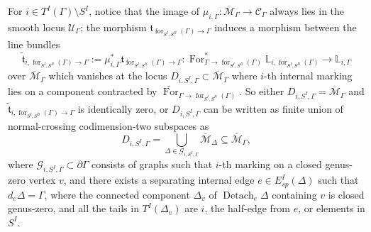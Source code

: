 \documentclass[11pt]{amsart}
\theoremstyle{definition}
\theoremstyle{remark}
\renewcommand{\for}{\operatorname{for}}
\newcommand{\For}{\operatorname{For}}
\newcommand{\<}{\left<}
\renewcommand{\>}{\right>}
\numberwithin{equation}{section}
\def\Mbar{{\overline{\mathcal M}}}
\begin{document}
For $i\in T^I(\Gamma)\setminus S^I$, notice that the image of $\mu_{i,\Gamma}\colon \Mbar_{\Gamma}\to \mathcal C_\Gamma$ always lies in the smooth locus %
$\mathcal U_{\Gamma}$; the %
morphism  %
$\mathfrak t_{\for_{{S^I,S^B}}(\Gamma)\to \Gamma}$ induces a %
morphism between the line bundles $$\tilde{\mathfrak t}_{i,\for_{{S^I,S^B}}(\Gamma)\to \Gamma}:=  \mu_{i,\Gamma}^*\mathfrak t_{\for_{{S^I,S^B}}(\Gamma)\to \Gamma}\colon \For_{\Gamma\to \for_{{S^I,S^B}}(\Gamma)}^*\mathbb L_{i,\for_{{S^I,S^B}}(\Gamma)}\to \mathbb L_{i,\Gamma}$$ over $\Mbar_\Gamma$ which vanishes at the locus $D_{i,S^I,\Gamma}\subset \Mbar_\Gamma$ where $i$-th internal marking lies on a component contracted by $\widetilde{\For}_{\Gamma\to \for_{{S^I,S^B}}(\Gamma)}$. So either $D_{i,S^I,\Gamma}= \Mbar_\Gamma$ and $\tilde{\mathfrak t}_{i,\for_{{S^I,S^B}}(\Gamma)\to \Gamma}$ is identically zero, or $D_{i,S^I,\Gamma}$ can be written as finite union of normal-crossing codimension-two subspaces as
$$
D_{i,S^I,\Gamma}=\bigcup_{\Delta \in \mathcal G_{i,S^I,\Gamma}} \Mbar_{\Delta} \subseteq\Mbar_{\Gamma},
$$
where $\mathcal G_{i,S^I,\Gamma}\subset \partial \Gamma$ consists of graphs such that $i$-th marking on a closed genus-zero vertex $v$, and %
there exists a separating %
internal edge $e\in E^I_{sp}(\Delta)$ such that $d_e\Delta=\Gamma$, where the connected component $\Delta_v$ of $\operatorname{Detach}_e \Delta$ containing $v$ is closed genus-zero, and  all the tails in $T^I(\Delta_v)$ are $i$, the half-edge from $e$, or elements in $S^I$. 
\end{document}
